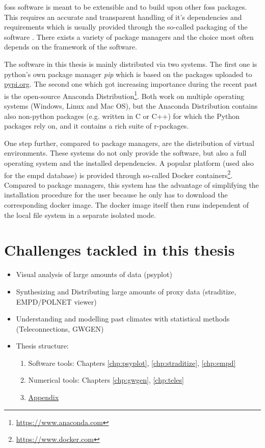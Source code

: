\begin{refsection}
\gls{foss} software is meant to be extensible and to build upon other \gls{foss} packages. This requires an accurate and transparent handling of it's dependencies and requirements which is usually provided through the so-called packaging of the software \citep[e.g.][]{Torborg2016}. There exists a variety of package managers and the choice most often depends on the framework of the software. 

The software in this thesis is mainly distributed via two systems. The first one is python's own package manager \textit{pip} which is based on the packages uploaded to \href{https://pypi.org/}{pypi.org}. The second one which got increasing importance during the recent past is the open-source Anaconda Distribution\footnote{\url{https://www.anaconda.com}}. Both work on multiple operating systems (Windows, Linux and Mac OS), but the Anaconda Distribution contains also non-python packages (e.g. written in C or C++) for which the Python packages rely on, and it contains a rich suite of r-packages.

One step further, compared to package managers, are the distribution of virtual environments. These systems do not only provide the software, but also a full operating system and the installed dependencies. A popular platform (used also for the \gls{empd} database) is provided through so-called Docker containers\footnote{\url{https://www.docker.com}}. Compared to package managers, this system has the advantage of simplifying the installation procedure for the user because he only has to download the corresponding docker image. The docker image itself then runs independent of the local file system in a separate isolated mode.



\section{Challenges tackled in this thesis} \label{sec:intro-thesis-overview}

\begin{itemize}
	\item Visual analysis of large amounts of data (psyplot)
	\item Synthesizing and Distributing large amounts of proxy data (straditize, EMPD/POLNET viewer)
	\item Understanding and modelling past climates with statistical methods (Teleconnections, GWGEN)
	\item Thesis structure:
		\begin{enumerate}
			\item Software tools: Chapters \ref{chp:psyplot}, \ref{chp:straditize}, \ref{chp:empd}
			\item Numerical tools: Chapters \ref{chp:gwgen}, \ref{chp:teles}
			\item \hyperlink{appendix}{Appendix}
		\end{enumerate}
\end{itemize}


\printbibliography[heading=subbibintoc]

\end{refsection}